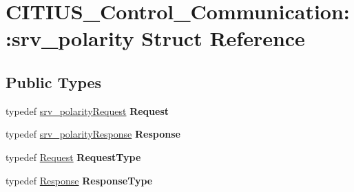 \hypertarget{struct_c_i_t_i_u_s___control___communication_1_1srv__polarity}{\section{\-C\-I\-T\-I\-U\-S\-\_\-\-Control\-\_\-\-Communication\-:\-:srv\-\_\-polarity \-Struct \-Reference}
\label{struct_c_i_t_i_u_s___control___communication_1_1srv__polarity}
}
\subsection*{\-Public \-Types}
\begin{DoxyCompactItemize}
\item 
\hypertarget{struct_c_i_t_i_u_s___control___communication_1_1srv__polarity_a745461942190bf8f1f39c5bdead92fd1}{typedef \hyperlink{struct_c_i_t_i_u_s___control___communication_1_1srv__polarity_request__}{srv\-\_\-polarity\-Request} {\bfseries \-Request}}\label{struct_c_i_t_i_u_s___control___communication_1_1srv__polarity_a745461942190bf8f1f39c5bdead92fd1}

\item 
\hypertarget{struct_c_i_t_i_u_s___control___communication_1_1srv__polarity_aa742e607076611514a1d678d345f2579}{typedef \hyperlink{struct_c_i_t_i_u_s___control___communication_1_1srv__polarity_response__}{srv\-\_\-polarity\-Response} {\bfseries \-Response}}\label{struct_c_i_t_i_u_s___control___communication_1_1srv__polarity_aa742e607076611514a1d678d345f2579}

\item 
\hypertarget{struct_c_i_t_i_u_s___control___communication_1_1srv__polarity_a3b5708efa636a7d787421154bafa5b19}{typedef \hyperlink{struct_c_i_t_i_u_s___control___communication_1_1srv__polarity_request__}{\-Request} {\bfseries \-Request\-Type}}\label{struct_c_i_t_i_u_s___control___communication_1_1srv__polarity_a3b5708efa636a7d787421154bafa5b19}

\item 
\hypertarget{struct_c_i_t_i_u_s___control___communication_1_1srv__polarity_a1888848c0cc11fca0c194a59a33b2856}{typedef \hyperlink{struct_c_i_t_i_u_s___control___communication_1_1srv__polarity_response__}{\-Response} {\bfseries \-Response\-Type}}\label{struct_c_i_t_i_u_s___control___communication_1_1srv__polarity_a1888848c0cc11fca0c194a59a33b2856}

\end{DoxyCompactItemize}
